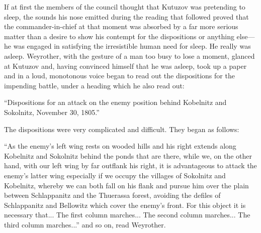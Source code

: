 If at first the members of the council thought that Kutuzov was
pretending to sleep, the sounds his nose emitted during the
reading that followed proved that the commander-in-chief at that
moment was absorbed by a far more serious matter than a desire to
show his contempt for the dispositions or anything else---he was
engaged in satisfying the irresistible human need for sleep. He
really was asleep. Weyrother, with the gesture of a man too busy
to lose a moment, glanced at Kutuzov and, having convinced
himself that he was asleep, took up a paper and in a loud,
monotonous voice began to read out the dispositions for the
impending battle, under a heading which he also read out:

``Dispositions for an attack on the enemy position behind
Kobelnitz and Sokolnitz, November 30, 1805.''

The dispositions were very complicated and difficult. They began
as follows:

``As the enemy's left wing rests on wooded hills and his right
extends along Kobelnitz and Sokolnitz behind the ponds that are
there, while we, on the other hand, with our left wing by far
outflank his right, it is advantageous to attack the enemy's
latter wing especially if we occupy the villages of Sokolnitz and
Kobelnitz, whereby we can both fall on his flank and pursue him
over the plain between Schlappanitz and the Thuerassa forest,
avoiding the defiles of Schlappanitz and Bellowitz which cover
the enemy's front. For this object it is necessary that...  The
first column marches... The second column marches... The third
column marches...'' and so on, read Weyrother.


